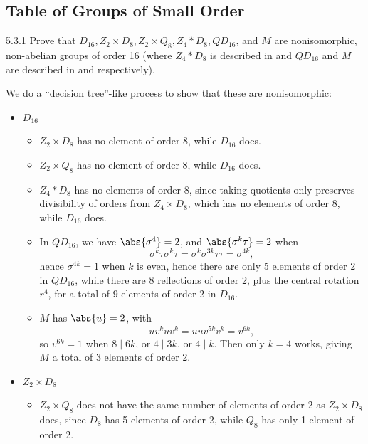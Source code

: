 \subsection{Table of Groups of Small Order}

\begin{exercise}{5.3.1}
    Prove that $D_{16}, Z_2 \times D_8, Z_2 \times Q_8, Z_4 \ast D_8, QD_{16}$, and $M$ are nonisomorphic, non-abelian groups of order 16 (where $Z_4 \ast D_8$ is described in  and $QD_{16}$ and $M$ are described in  and  respectively).
\end{exercise}

\begin{sol}
    We do a ``decision tree''-like process to show that these are nonisomorphic:
    \begin{itemize}
        \item $D_{16}$
        \begin{itemize}
            \item $Z_2 \times D_8$ has no element of order 8, while $D_{16}$ does.
            \item $Z_2 \times Q_8$ has no element of order 8, while $D_{16}$ does.
            \item $Z_4 \ast D_8$ has no elements of order 8, since taking quotients only preserves divisibility of orders from $Z_4 \times D_8$, which has no elements of order 8, while $D_{16}$ does.
            \item In $QD_{16}$, we have $\abs{\sigma^4} = 2$, and $\abs{\sigma^k\tau} = 2$ when
            \[
            	\sigma^k\tau\sigma^k\tau = \sigma^k\sigma^{3k}\tau\tau = \sigma^{4k},
            \]
            hence $\sigma^{4k} = 1$ when $k$ is even, hence there are only 5 elements of order 2 in $QD_{16}$, while there are 8 reflections of order 2, plus the central rotation $r^4$, for a total of 9 elements of order 2 in $D_{16}$.
            \item $M$ has $\abs{u} = 2$, with
            \[
            	uv^kuv^k = uuv^{5k}v^k = v^{6k},
            \]
            so $v^{6k} = 1$ when $8 \mid 6k$, or $4 \mid 3k$, or $4 \mid k$.
	Then only $k = 4$ works, giving $M$ a total of 3 elements of order 2.
        \end{itemize}
        \item $Z_2 \times D_8$
        \begin{itemize}
            \item $Z_2 \times Q_8$ does not have the same number of elements of order 2 as $Z_2 \times D_8$ does, since $D_8$ has 5 elements of order 2, while $Q_8$ has only 1 element of order 2.

\end{itemize}
\end{itemize}
\end{sol}
